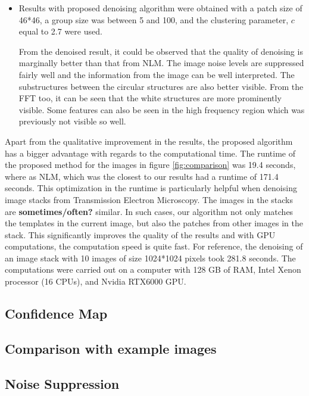 \documentclass[fleqn,10pt]{wlscirep}
\begin{document}
\begin{itemize}
	\item Results with proposed denoising algorithm were obtained with a patch size of 46*46, a group size was between 5 and 100, and the clustering parameter, $c$ equal to 2.7 were used. 
	
	From the denoised result, it could be observed that the quality of denoising is marginally better than that from NLM. The image noise levels are suppressed fairly well and the information from the image can be well interpreted. The substructures between the circular structures are also better visible. From the FFT too, it can be seen that the white structures are more prominently visible. Some features can also be seen in the high frequency region which was previously not visible so well.
\end{itemize}

Apart from the qualitative improvement in the results, the proposed algorithm has a bigger advantage with regards to the computational time. The runtime of the proposed method for the images in figure \ref{fig:comparison} was 19.4 seconds, where as NLM, which was the closest to our results had a runtime of 171.4 seconds. This optimization in the runtime is particularly helpful when denoising image stacks from Transmission Electron Microscopy. The images in the stacks are \textbf{sometimes/often?} similar. In such cases, our algorithm not only matches the templates in the current image, but also the patches from other images in the stack. This significantly improves the quality of the results and with GPU computations, the computation speed is quite fast. For reference, the denoising of an image stack with 10 images of size 1024*1024 pixels took 281.8 seconds. The computations were carried out on a computer with 128 GB of RAM, Intel Xenon processor (16 CPUs), and Nvidia RTX6000 GPU.

\subsection*{Confidence Map}

\subsection*{Comparison with example images}


\subsection*{Noise Suppression}
\end{document}
